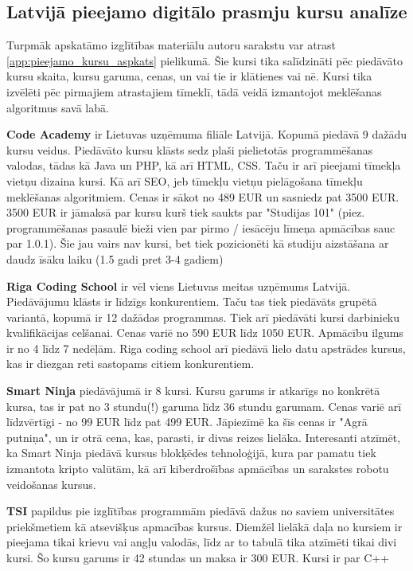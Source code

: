 \subsection{Latvijā pieejamo digitālo prasmju kursu analīze}
Turpmāk apskatāmo izglītības materiālu autoru sarakstu var atrast \ref{app:pieejamo_kursu_aspkats} pielikumā.
Šie kursi tika salīdzināti pēc piedāvāto kursu skaita, kursu garuma, cenas, un vai tie ir klātienes vai nē.
Kursi tika izvēlēti pēc pirmajiem atrastajiem tīmeklī, tādā veidā izmantojot meklēšanas algoritmus savā labā.
\par
\textbf{Code Academy} ir Lietuvas uzņēmuma filiāle Latvijā. Kopumā piedāvā 9 dažādu kursu veidus. Piedāvāto kursu klāsts
sedz plaši pielietotās programmēšanas valodas, tādas kā Java un PHP, kā arī HTML, CSS. Taču ir arī pieejami
tīmekļa vietņu dizaina kursi. Kā arī SEO, jeb tīmekļu vietņu pielāgošana tīmekļu meklēšanas algoritmiem.
Cenas ir sākot no 489 EUR un sasniedz pat 3500 EUR. 3500 EUR ir jāmaksā par kursu kurš tiek saukts par
"Studijas 101" (piez. programmēšanas pasaulē bieži vien par pirmo / iesācēju līmeņa apmācības sauc par 1.0.1).
Šie jau vairs nav kursi, bet tiek pozicionēti kā studiju aizstāšana ar daudz īsāku laiku (1.5 gadi pret 3-4 gadiem)
\par
\textbf{Riga Coding School} ir vēl viens Lietuvas meitas uzņēmums Latvijā. Piedāvājumu klāsts ir līdzīgs konkurentiem.
Taču tas tiek piedāvāts grupētā variantā, kopumā ir 12 dažādas programmas. Tiek arī piedāvāti kursi darbinieku 
kvalifikācijas celšanai. Cenas variē no 590 EUR līdz 1050 EUR. Apmācību ilgums ir no 4 līdz 7 nedēļām. Riga coding
school arī piedāvā lielo datu apstrādes kursus, kas ir diezgan reti sastopams citiem konkurentiem.
\par
\textbf{Smart Ninja} piedāvājumā ir 8 kursi. Kursu garums ir atkarīgs no konkrētā kursa, tas ir pat no 3 stundu(!)
garuma līdz 36 stundu garumam. Cenas variē arī līdzvērtīgi - no 99 EUR līdz pat 499 EUR. Jāpiezīmē ka šīs cenas
ir "Agrā putniņa", un ir otrā cena, kas, parasti, ir divas reizes lielāka.  Interesanti atzīmēt, ka
Smart Ninja piedāvā kursus blokķēdes tehnoloģijā, kura par pamatu tiek izmantota kripto valūtām, kā arī
kiberdrošības apmācības un sarakstes robotu veidošanas kursus.
\par
\textbf{TSI} papildus pie izglītības programmām piedāvā dažus no saviem universitātes priekšmetiem kā atsevišķus
apmacības kursus. Diemžēl lielākā daļa no kursiem ir pieejama tikai krievu vai angļu valodās, līdz ar to
tabulā tika atzīmēti tikai divi kursi. Šo kursu garums ir 42 stundas un maksa ir 300 EUR. Kursi ir par C++ 
